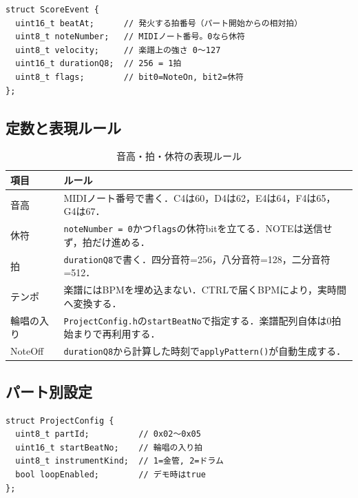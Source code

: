 \documentclass[uplatex,dvipdfmx]{jlreq}
\newcommand{\code}[1]{\texttt{#1}}
\begin{document}
\begin{verbatim}
struct ScoreEvent {
  uint16_t beatAt;      // 発火する拍番号（パート開始からの相対拍）
  uint8_t noteNumber;   // MIDIノート番号。0なら休符
  uint8_t velocity;     // 楽譜上の強さ 0〜127
  uint16_t durationQ8;  // 256 = 1拍
  uint8_t flags;        // bit0=NoteOn, bit2=休符
};
\end{verbatim}

\subsection{定数と表現ルール}

\begin{table}[h]
\centering
\caption{音高・拍・休符の表現ルール}
\label{tab:notation-rule}
\begin{tabular}{p{}p{}}
\toprule
\textbf{項目} & \textbf{ルール} \\
\midrule
音高 & MIDIノート番号で書く．C4は60，D4は62，E4は64，F4は65，G4は67．\\
休符 & \code{noteNumber = 0}かつ\code{flags}の休符bitを立てる．NOTEは送信せず，拍だけ進める．\\
拍 & \code{durationQ8}で書く．四分音符=256，八分音符=128，二分音符=512．\\
テンポ & 楽譜にはBPMを埋め込まない．CTRLで届くBPMにより，実時間へ変換する．\\
輪唱の入り & \code{ProjectConfig.h}の\code{startBeatNo}で指定する．楽譜配列自体は0拍始まりで再利用する．\\
NoteOff & \code{durationQ8}から計算した時刻で\code{applyPattern()}が自動生成する．\\
\bottomrule
\end{tabular}
\end{table}

\subsection{パート別設定}

\begin{verbatim}
struct ProjectConfig {
  uint8_t partId;          // 0x02〜0x05
  uint16_t startBeatNo;    // 輪唱の入り拍
  uint8_t instrumentKind;  // 1=金管, 2=ドラム
  bool loopEnabled;        // デモ時はtrue
};
\end{verbatim}
\end{document}
